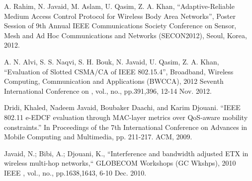 \documentclass[journal]{IEEEtran}
\begin{document}
\begin{thebibliography}{1}
A. Rahim, N. Javaid, M. Aslam, U. Qasim, Z. A. Khan, ``Adaptive-Reliable Medium Access Control Protocol for Wireless Body Area Networks'', Poster Session of 9th Annual IEEE Communications Society Conference on Sensor, Mesh and Ad Hoc Communications and Networks (SECON2012), Seoul, Korea, 2012.

A. N. Alvi, S. S. Naqvi, S. H. Bouk, N. Javaid, U. Qasim, Z. A. Khan, ``Evaluation of Slotted CSMA/CA of IEEE 802.15.4'', Broadband, Wireless Computing, Communication and Applications (BWCCA), 2012 Seventh International Conference on , vol., no., pp.391,396, 12-14 Nov. 2012.

Dridi, Khaled, Nadeem Javaid, Boubaker Daachi, and Karim Djouani. ``IEEE 802.11 e-EDCF evaluation through MAC-layer metrics over QoS-aware mobility constraints.'' In Proceedings of the 7th International Conference on Advances in Mobile Computing and Multimedia, pp. 211-217. ACM, 2009.

Javaid, N.; Bibi, A.; Djouani, K., ``Interference and bandwidth adjusted ETX in wireless multi-hop networks,`` GLOBECOM Workshops (GC Wkshps), 2010 IEEE , vol., no., pp.1638,1643, 6-10 Dec. 2010.

\end{thebibliography}
\end{document}
